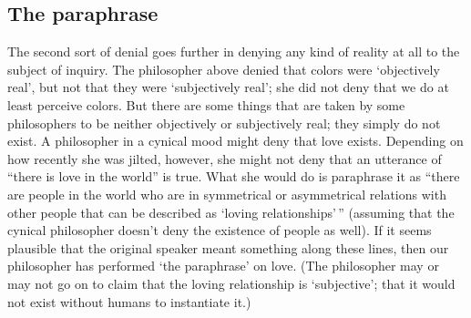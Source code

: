 \documentclass[11pt]{article}
\begin{document}
\begin{spacing}{1.5}
\section{The paraphrase}
\label{paraphrase}
The second sort of denial goes further in denying any kind of reality at all to the subject of inquiry. The philosopher above denied that colors were `objectively real', but not that they were `subjectively real'; she did not deny that we do at least perceive colors. But there are some things that are taken by some philosophers to be neither objectively or subjectively real; they simply do not exist. A philosopher in a cynical mood might deny that love exists. Depending on how recently she was jilted, however, she might not deny that an utterance of ``there is love in the world'' is true. What she would do is paraphrase it as ``there are people in the world who are in symmetrical or asymmetrical relations with other people that can be described as `loving relationships'\,'' (assuming that the cynical philosopher doesn't deny the existence of people as well). If it seems plausible that the original speaker meant something along these lines, then our philosopher has performed `the paraphrase' on love. (The philosopher may or may not go on to claim that the loving relationship is `subjective'; that it would not exist without humans to instantiate it.)


\end{spacing}
\end{document}
